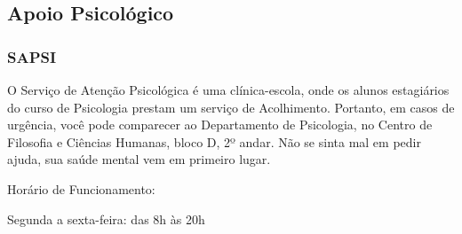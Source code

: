\subsection{Apoio Psicológico}
\subsubsection{SAPSI}
O Serviço de Atenção Psicológica é uma clínica-escola, onde os alunos estagiários do curso de Psicologia prestam um serviço de Acolhimento.
Portanto, em casos de urgência, você pode comparecer ao Departamento de Psicologia, no Centro de Filosofia e Ciências Humanas, bloco D, 2º andar.
Não se sinta mal em pedir ajuda, sua saúde mental vem em primeiro lugar.

Horário de Funcionamento:

Segunda a sexta-feira: das 8h às 20h

